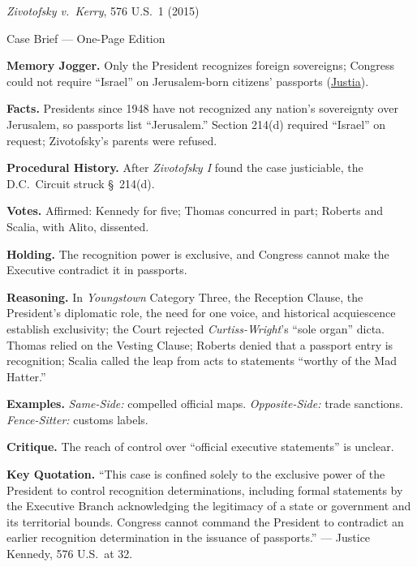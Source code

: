 \documentclass[12pt]{article}
\begin{document}
\begin{center}
{\Large \textit{Zivotofsky v.\ Kerry}, 576 U.S.\ 1 (2015)\par}
\vspace{0.3em}
{\normalsize Case Brief --- One-Page Edition\par}
\end{center}

\textbf{Memory Jogger.} Only the President recognizes foreign sovereigns; Congress could not require ``Israel'' on Jerusalem-born citizens' passports (\href{https://supreme.justia.com/cases/federal/us/576/1/}{Justia}).

\textbf{Facts.} Presidents since 1948 have not recognized any nation's sovereignty over Jerusalem, so passports list ``Jerusalem.'' Section 214(d) required ``Israel'' on request; Zivotofsky's parents were refused.

\textbf{Procedural History.} After \textit{Zivotofsky I} found the case justiciable, the D.C.\ Circuit struck \S~214(d).

\textbf{Votes.} Affirmed: Kennedy for five; Thomas concurred in part; Roberts and Scalia, with Alito, dissented.

\textbf{Holding.} The recognition power is exclusive, and Congress cannot make the Executive contradict it in passports.

\textbf{Reasoning.} In \textit{Youngstown} Category Three, the Reception Clause, the President's diplomatic role, the need for one voice, and historical acquiescence establish exclusivity; the Court rejected \textit{Curtiss-Wright}'s ``sole organ'' dicta. Thomas relied on the Vesting Clause; Roberts denied that a passport entry is recognition; Scalia called the leap from acts to statements ``worthy of the Mad Hatter.''

\textbf{Examples.} \emph{Same-Side:} compelled official maps. \emph{Opposite-Side:} trade sanctions. \emph{Fence-Sitter:} customs labels.

\textbf{Critique.} The reach of control over ``official executive statements'' is unclear.

\textbf{Key Quotation.} ``This case is confined solely to the exclusive power of the President to control recognition determinations, including formal statements by the Executive Branch acknowledging the legitimacy of a state or government and its territorial bounds. Congress cannot command the President to contradict an earlier recognition determination in the issuance of passports.'' --- Justice Kennedy, 576 U.S.\ at 32.
\end{document}
